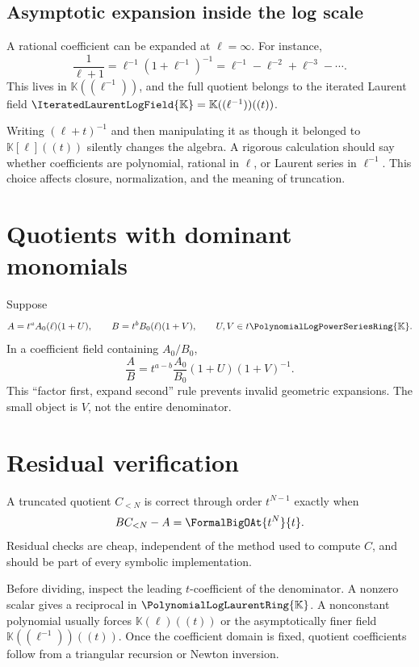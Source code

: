 \documentclass[11pt,oneside,openany]{book}
\newcommand{\K}{\mathbb{K}}
\newcommand{\Rring}{\PolynomialLogPowerSeriesRing{\K}}
\newcommand{\Pring}{\PolynomialLogLaurentRing{\K}}
\newcommand{\Fring}{\IteratedLaurentLogField{\K}}
\begin{document}
\subsection{Asymptotic expansion inside the log scale}
A rational coefficient can be expanded at \(\ell=\infty\).  For instance,
\begin{equation}\label{eq:rationalell}
 \frac{1}{\ell+1}
 =\ell^{-1}\left(1+\ell^{-1}\right)^{-1}
 =\ell^{-1}-\ell^{-2}+\ell^{-3}-\cdots.
\end{equation}
This lives in \(\K((\ell^{-1}))\), and the full quotient belongs to the
iterated Laurent field \(\Fring=\K((\ell^{-1}))((t))\).

\begin{cautionbox}
Writing \((\ell+t)^{-1}\) and then manipulating it as though it belonged to
\(\K[\ell]((t))\) silently changes the algebra.  A rigorous calculation should
say whether coefficients are polynomial, rational in \(\ell\), or Laurent
series in \(\ell^{-1}\).  This choice affects closure, normalization, and the
meaning of truncation.
\end{cautionbox}

\section{Quotients with dominant monomials}
Suppose
\[
 A=t^aA_0(\ell)(1+U),
 \qquad
 B=t^bB_0(\ell)(1+V),
 \qquad U,V\in t\Rring.
\]
In a coefficient field containing \(A_0/B_0\),
\begin{equation}\label{eq:generalquotient}
 \frac AB=t^{a-b}\frac{A_0}{B_0}(1+U)(1+V)^{-1}.
\end{equation}
This ``factor first, expand second'' rule prevents invalid geometric expansions.
The small object is \(V\), not the entire denominator.

\section{Residual verification}
A truncated quotient \(C_{<N}\) is correct through order \(t^{N-1}\) exactly
when
\begin{equation}\label{eq:divisionresidual}
 BC_{<N}-A=\FormalBigOAt{t^N}{t}.
\end{equation}
Residual checks are cheap, independent of the method used to compute \(C\), and
should be part of every symbolic implementation.

\begin{summarybox}
Before dividing, inspect the leading \(t\)-coefficient of the denominator.
A nonzero scalar gives a reciprocal in \(\Pring\).  A nonconstant polynomial
usually forces \(\K(\ell)((t))\) or the asymptotically finer field
\(\K((\ell^{-1}))((t))\).  Once the coefficient domain is fixed, quotient
coefficients follow from a triangular recursion or Newton inversion.
\end{summarybox}
\end{document}
